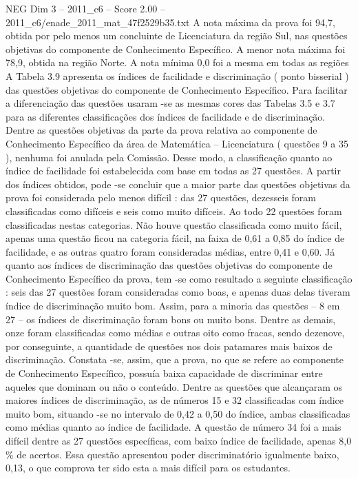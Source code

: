 \begin{textsample}{NEG Dim 3 – 2011\_c6 – Score 2.00 – 2011\_c6/enade\_2011\_mat\_47f2529b35.txt}
A nota máxima da prova foi 94,7, obtida por pelo menos um concluinte de Licenciatura da região Sul, nas questões objetivas do componente de Conhecimento Específico.
A menor nota máxima foi 78,9, obtida na região Norte.
A nota mínima 0,0 foi a mesma em todas as regiões A Tabela 3.9 apresenta os índices de facilidade e discriminação ( ponto bisserial ) das questões objetivas do componente de Conhecimento Específico.
Para facilitar a diferenciação das questões usaram -se as mesmas cores das Tabelas 3.5 e 3.7 para as diferentes classificações dos índices de facilidade e de discriminação.
Dentre as questões objetivas da parte da prova relativa ao componente de Conhecimento Específico da área de Matemática – Licenciatura ( questões 9 a 35 ), nenhuma foi anulada pela Comissão.
Desse modo, a classificação quanto ao índice de facilidade foi estabelecida com base em todas as 27 questões.
A partir dos índices obtidos, pode -se concluir que a maior parte das questões objetivas da prova foi considerada pelo menos difícil : das 27 questões, dezesseis foram classificadas como difíceis e seis como muito difíceis.
Ao todo 22 questões foram classificadas nestas categorias.
Não houve questão classificada como muito fácil, apenas uma questão ficou na categoria fácil, na faixa de 0,61 a 0,85 do índice de facilidade, e as outras quatro foram consideradas médias, entre 0,41 e 0,60.
Já quanto aos índices de discriminação das questões objetivas do componente de Conhecimento Específico da prova, tem -se como resultado a seguinte classificação : seis das 27 questões foram consideradas como boas, e apenas duas delas tiveram índice de discriminação muito bom.
Assim, para a minoria das questões – 8 em 27 – os índices de discriminação foram bons ou muito bons.
Dentre as demais, onze foram classificadas como médias e outras oito como fracas, sendo dezenove, por conseguinte, a quantidade de questões nos dois patamares mais baixos de discriminação.
Constata -se, assim, que a prova, no que se refere ao componente de Conhecimento Específico, possuía baixa capacidade de discriminar entre aqueles que dominam ou não o conteúdo.
Dentre as questões que alcançaram os maiores índices de discriminação, as de números 15 e 32 classificadas com índice muito bom, situando -se no intervalo de 0,42 a 0,50 do índice, ambas classificadas como médias quanto ao índice de facilidade.
A questão de número 34 foi a mais difícil dentre as 27 questões específicas, com baixo índice de facilidade, apenas 8,0 \% de acertos.
Essa questão apresentou poder discriminatório igualmente baixo, 0,13, o que comprova ter sido esta a mais difícil para os estudantes.

\end{textsample}
